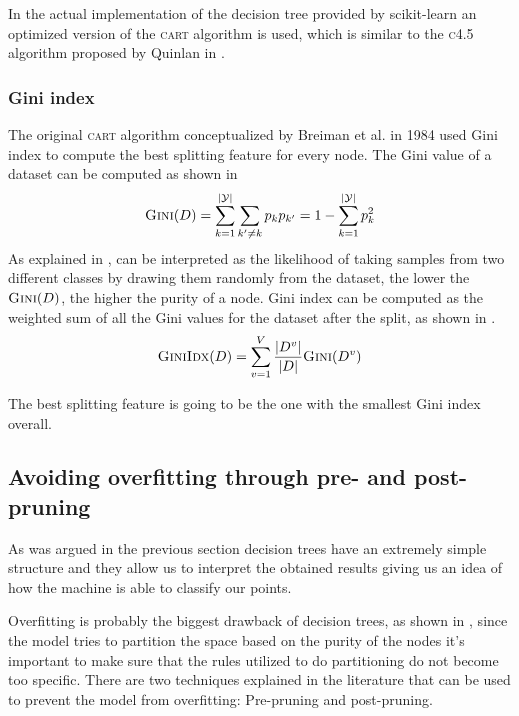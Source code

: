 In the actual implementation of the decision tree provided by scikit-learn an optimized version of
the \textsc{cart} algorithm is used, which  is similar to the \textsc{c4.5} algorithm proposed by Quinlan in
\cite{quinlan2014c4}.

\subsubsection{Gini index}
The original \textsc{cart} algorithm conceptualized by Breiman et al. in 1984
\cite{breiman1984classification} used Gini index to compute the best splitting feature for every
node. The Gini value of a dataset can be computed as shown in 
\begin{equation}
	\label{eq:gini-value}
	\textsc{Gini}(D) = \sum_{k = 1}^{|\mathcal{Y}|}\sum_{k' \neq k} p_kp_{k'} = 1 - \sum_{k =
		1}^{|\mathcal{Y}|}p_k^2
\end{equation}
As explained in \cite{ZhouZhi-Hua2021ML},  can be interpreted as the
likelihood of taking samples from two different classes by drawing them randomly from the
dataset, the lower the $\textsc{Gini}(D)$, the higher the purity of a node. Gini index can be
computed as the weighted sum of all the Gini values for the dataset after the split, as shown in
.
\begin{equation}
	\label{eq:gini-index}
	\textsc{GiniIdx}(D) = \sum_{v = 1}^V\frac{|D^v|}{|D|} \textsc{Gini}(D^v)
\end{equation}

The best splitting feature is going to be the one with the smallest Gini index overall.

\subsection{Avoiding overfitting through pre- and post- pruning}
As was argued in the previous section decision trees have an extremely simple structure and they
allow us to interpret the obtained results giving us an idea of how the machine is able to classify
our points.

Overfitting is probably the biggest drawback of decision trees, as shown in
\cite{overfitting-dt-erblin}, since the model tries to partition the space based on the purity of
the nodes it's important to make sure that the rules utilized to do partitioning do not become too
specific. There are two techniques explained in the literature that can be used to prevent the model
from overfitting: Pre-pruning and post-pruning.

